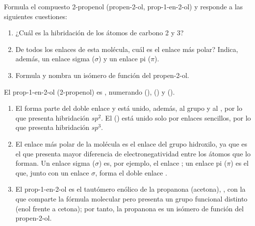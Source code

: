 \begin{exerciseEVAU}
    Formula el compuesto 2-propenol (propen-2-ol, prop-1-en-2-ol) y responde a las siguientes cuestiones:

    \begin{enumerate}[label=\letraminuscula]
        \item ¿Cuál es la hibridación de los átomos de carbono 2 y 3?
        \item De todos los enlaces de esta molécula, cuál es el enlace más polar?
        Indica, además, un enlace sigma (\(\sigma\)) y un enlace pi (\(\pi\)).
        \item Formula y nombra un isómero de función del propen-2-ol.
    \end{enumerate}

    \begin{solu}

        El prop-1-en-2-ol (2-propenol) es , numerando (), () y ().
        \begin{enumerate}[label=\letraminuscula]
            \item El  forma parte del doble enlace  y está unido, además, al grupo  y al , por lo que presenta hibridación \(sp^2\). El  () está unido solo por enlaces sencillos, por lo que presenta hibridación \(sp^3\).

            \item El enlace más polar de la molécula es el enlace  del grupo hidroxilo, ya que es el que presenta mayor diferencia de electronegatividad entre los átomos que lo forman. Un enlace sigma (\(\sigma\)) es, por ejemplo, el enlace ; un enlace pi (\(\pi\)) es el que, junto con un enlace \(\sigma\), forma el doble enlace .

            \item El prop-1-en-2-ol es el tautómero enólico de la propanona (acetona), , con la que comparte la fórmula molecular  pero presenta un grupo funcional distinto (enol frente a cetona); por tanto, la propanona es un isómero de función del propen-2-ol.
        \end{enumerate}
    \end{solu}
\end{exerciseEVAU}


